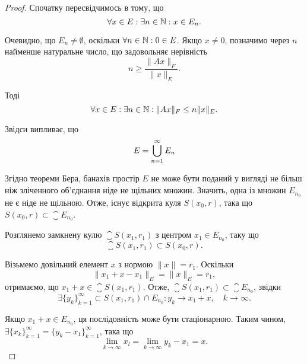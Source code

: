 \begin{proof}
Спочатку пересвідчимось в тому, що
\begin{equation*}
    \forall x \in E: \exists n \in \mathbb{N}: x \in E_n.
\end{equation*}

Очевидно, що $E_n \ne \emptyset$, оскільки $\forall n \in \mathbb{N}: 0 \in E$.
Якщо $x \ne 0$, позначимо через $n$ найменше натуральне число, що
задовольняє нерівність
\begin{equation*}
    n \ge \frac{\|A x\|_F}{\|x\|_E}.
\end{equation*}

Тоді
\begin{equation*}
    \forall x \in E: \exists n \in \mathbb{N}: \|Ax\|_F \le n \|x\|_E.
\end{equation*}

Звідси випливає, що
\begin{equation*}
    E = \operatorname*{\bigcup}_{n = 1}^\infty E_n
\end{equation*}

Згідно теореми Бера, банахів простір $E$ не може бути
поданий у вигляді не більш ніж зліченного об’єднання ніде
не щільних множин. Значить, одна із множин $E_{n_0}$ не є ніде
не щільною. Отже, існує відкрита куля $S(x_0, r)$, така що
$S(x_0, r) \subset \closure E_{n_0}$.

Розглянемо замкнену кулю $\closure S(x_1, r_1)$ з центром
$x_1 \in E_{n_0}$, таку що
\begin{equation*}
    \closure S(x_1, r_1) \subset S(x_0, r).
\end{equation*}

Візьмемо довільний елемент $x$ з нормою $\|x\| = r_1$. Оскільки
\begin{equation*}
    \|x_1 + x - x_1\|_E = \|x\|_E = r_1,
\end{equation*}
отримаємо, що $x_1 + x \in \closure S(x_1, r_1)$. Отже,
$\closure S(x_1, r_1) \subset \closure E_{n_0}$, звідки
\begin{equation*}
    \exists \{y_k\}_{k = 1}^\infty \subset S(x_1, r_1) \cap E_{n_0}:
    y_k \to x_1 + x, \quad k \to \infty.
\end{equation*}

Якщо $x_1 + x \in E_{n_0}$, ця послідовність може бути стаціонарною.
Таким чином, $\exists \{x_k\}_{k = 1}^\infty = \{y_k - x_1\}_{k = 1}^\infty$, така
що
\begin{equation*}
    \lim_{k \to \infty} x_l = \lim_{k \to \infty} y_k - x_1 = x.
\end{equation*}


\end{proof}
